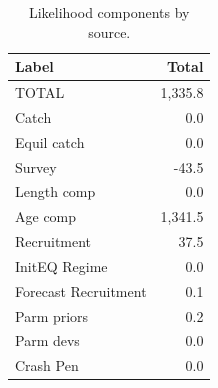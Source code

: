 \documentclass[
  english,
]{article}
\begin{document}
\begin{longtable}{lr}

\caption{\label{tbl-likes}Likelihood components by source.}

\tabularnewline

\toprule
Label & Total \\ 
\midrule\addlinespace[2.5pt]
TOTAL & 1,335.8 \\ 
Catch & 0.0 \\ 
Equil catch & 0.0 \\ 
Survey & -43.5 \\ 
Length comp & 0.0 \\ 
Age comp & 1,341.5 \\ 
Recruitment & 37.5 \\ 
InitEQ Regime & 0.0 \\ 
Forecast Recruitment & 0.1 \\ 
Parm priors & 0.2 \\ 
Parm devs & 0.0 \\ 
Crash Pen & 0.0 \\ 
\bottomrule

\end{longtable}

\endgroup

\newpage{}

\begingroup
\fontsize{9.0pt}{11.0pt}\selectfont
\end{document}
